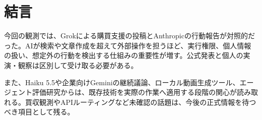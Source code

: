 \section*{結言}
今回の観測では、Grokによる購買支援の投稿とAnthropicの行動報告が対照的だった。AIが検索や文章作成を超えて外部操作を担うほど、実行権限、個人情報の扱い、想定外の行動を検出する仕組みの重要性が増す。公式発表と個人の実演・観察は区別して受け取る必要がある。

また、Haiku 5.5や企業向けGeminiの継続議論、ローカル動画生成ツール、エージェント評価研究からは、既存技術を実際の作業へ適用する段階の関心が読み取れる。買収観測やAPIルーティングなど未確認の話題は、今後の正式情報を待つべき項目として残る。
